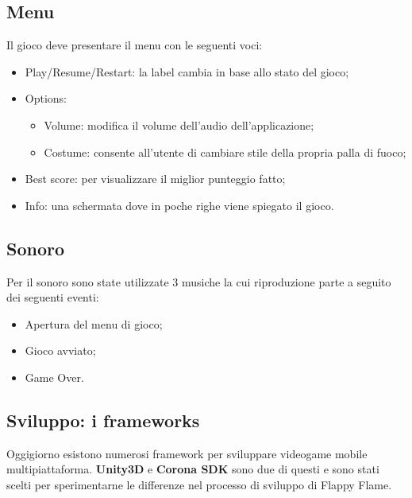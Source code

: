 		\subsection{Menu}
			Il gioco deve presentare il menu con le seguenti voci:
			\begin{itemize}
				\item Play/Resume/Restart: la label cambia in base allo stato del gioco;
				\item Options:
				\begin{itemize}
					\item Volume: modifica il volume dell'audio dell'applicazione;
					\item Costume: consente all'utente di cambiare stile della propria palla di fuoco;
				\end{itemize}
				\item Best score: per visualizzare il miglior punteggio fatto;
				\item Info: una schermata dove in poche righe viene spiegato il gioco.
			\end{itemize}
		
		\subsection{Sonoro}
			Per il sonoro sono state utilizzate 3 musiche la cui riproduzione parte a seguito dei seguenti eventi:
			\begin{itemize}
				\item Apertura del menu di gioco;
				\item Gioco avviato;
				\item Game Over.
			\end{itemize}
	

	
	\subsection{Sviluppo: i frameworks}
		Oggigiorno esistono numerosi framework per sviluppare videogame mobile multipiattaforma. \textbf{Unity3D} e \textbf{Corona SDK} sono due di questi e sono stati scelti per sperimentarne le differenze nel processo di sviluppo di Flappy Flame.
		
